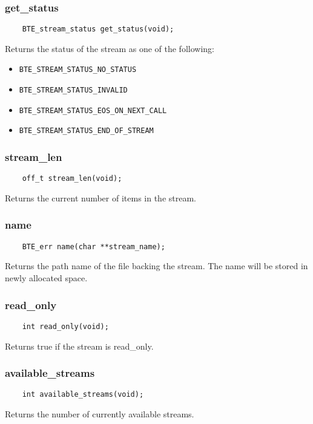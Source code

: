 \subsubsection{get\_status}
\begin{verbatim}
    BTE_stream_status get_status(void);
\end{verbatim}
Returns the status of the stream as one
of the following:
\begin{itemize}
\item \verb|BTE_STREAM_STATUS_NO_STATUS|
\item \verb|BTE_STREAM_STATUS_INVALID|
\item \verb|BTE_STREAM_STATUS_EOS_ON_NEXT_CALL|
\item \verb|BTE_STREAM_STATUS_END_OF_STREAM|
\end{itemize}


\subsubsection{stream\_len}
\begin{verbatim}
    off_t stream_len(void);
\end{verbatim}
Returns the current number of items in the stream.


\subsubsection{name}
\begin{verbatim}
    BTE_err name(char **stream_name);
\end{verbatim}
Returns the path name of the file backing the stream. The name will be
stored in newly allocated space.


\subsubsection{read\_only}
\begin{verbatim}
    int read_only(void);
\end{verbatim}
Returns true if the stream is read\_only.

    
\subsubsection{available\_streams}
\begin{verbatim}
    int available_streams(void);    
\end{verbatim}
Returns the number of currently available streams.

